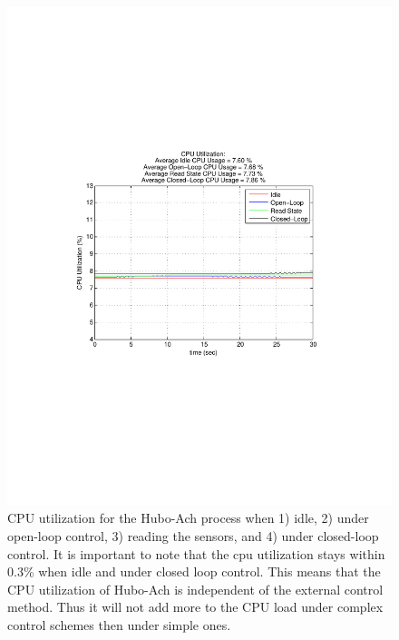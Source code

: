 \begin{figure}[thpb]
  \centering
\includegraphics[width=0.6\columnwidth]{./timingData/cpu.pdf}
  \caption{CPU utilization for the Hubo-Ach process when 1) idle, 2) under open-loop control, 3) reading the sensors, and 4) under closed-loop control.  
It is important to note that the cpu utilization stays within 0.3\% when idle and under closed loop control.
This means that the CPU utilization of Hubo-Ach is independent of the external control method.
Thus it will not add more to the CPU load under complex control schemes then under simple ones.}
  \label{fig:timing-getTrigger}
\end{figure}

